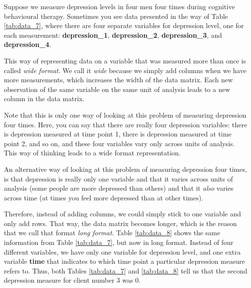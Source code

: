 Suppose we measure depression levels in four men four times during cognitive behavioural therapy. Sometimes you see data presented in the way of Table \ref{tab:data_7}, where there are four separate variables for depression level, one for each measurement: \textbf{depression\_1}, \textbf{depression\_2}, \textbf{depression\_3}, and \textbf{depression\_4}.

\begin{kframe}


{\ttfamily\noindent\bfseries{}}\end{kframe}

\begin{kframe}


{\ttfamily\noindent\bfseries{}}\end{kframe}


This way of representing data on a variable that was measured more than once is called \textit{wide format}. We call it \textit{wide} because we simply add columns when we have more measurements, which increases the width of the data matrix. Each new observation of the same variable on the same unit of analysis leads to a new column in the data matrix.

Note that this is only one way of looking at this problem of measuring depression four times. Here, you can say that there are really four depression variables: there is depression measured at time point 1, there is depression measured at time point 2, and so on, and these four variables vary only across units of analysis. This way of thinking leads to a wide format representation.

An alternative way of looking at this problem of measuring depression four times, is that depression is really only one variable and that it varies across units of analysis (some people are more depressed than others) and that it \textit{also} varies across time (at times you feel more depressed than at other times).

Therefore, instead of adding columns, we could simply stick to one variable and only add rows. That way, the data matrix becomes longer, which is the reason that we call that format \textit{long format}. Table \ref{tab:data_8} shows the same information from Table \ref{tab:data_7}, but now in long format. Instead of four different variables, we have only one variable for depression level, and one extra variable \textbf{time} that indicates to which time point a particular depression measure refers to. Thus, both Tables \ref{tab:data_7} and \ref{tab:data_8} tell us that the second depression measure for client number 3 was 0.

